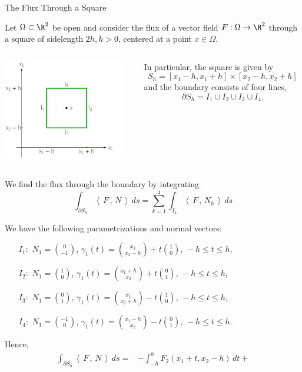 \documentclass[smaller,hyperref={CJKbookmarks=true}]{beamer}
\newcommand{\scp}[2]{\left\langle\,#1\,,\,#2\,\right\rangle} \newcommand{\scpp}{\langle\,\cdot\,,\,\cdot\,\rangle}
\begin{document}
\begin{frame}{The Flux Through a Square}
\begin{spacing}{0.9}
Let $\Omega\subset\R^2$ be open and consider the flux of a vector field $F:\Omega\to\R^2$ through a square of sidelength $2h,h>0$, centered at a point $x\in\Omega$.%
\begin{columns}[onlytextwidth]
\begin{column}{0.5\textwidth}
\includegraphics[width=\columnwidth,height=125pt]{89.jpg}
\end{column}
\begin{column}{0.5\textwidth}
In particular, the square is given by
\[S_h=[x_1-h,x_1+h]\times[x_2-h,x_2+h]\]
and the boundary consists of four lines,
\[\partial S_h=I_1\cup I_2\cup I_3\cup I_4.\]
\end{column}
\end{columns}
We find the flux through the boundary by integrating
\[\int_{\partial S_h}\scp{F}{N}\,ds=\sum_{k=1}^{4}\int_{I_k}\scp{F}{N_k}\,ds\]
\end{spacing}
\newpage
\begin{spacing}{1.05}
We have the following parametrizations and normal vectors:
\begin{itemize}
  \item[$I_1:$] $N_1=\binom{0}{-1}$, $\gamma_1(t)=\binom{x_1}{x_2-h}+t\binom{1}{0},\,
      -h\leq t\leq h$,
  \item[$I_2:$] $N_1=\binom{1}{0}$, $\gamma_1(t)=\binom{x_1+h}{x_2}+t\binom{0}{1},\,
      -h\leq t\leq h$,
  \item[$I_3:$] $N_1=\binom{0}{1}$, $\gamma_1(t)=\binom{x_1}{x_2+h}-t\binom{1}{0},\,
      -h\leq t\leq h$,
  \item[$I_4:$] $N_1=\binom{-1}{0}$, $\gamma_1(t)=\binom{x_1-h}{x_2}-t\binom{0}{1},\,
      -h\leq t\leq h$.
\end{itemize}
Hence,
\begin{equation*}
  \begin{split}
     \int_{\partial S_h}\scp{F}{N}\,ds= &-\int_{-h}^{h}F_2(x_1+t,x_2-h)\,dt+

\end{split}
\end{equation*}
\end{spacing}
\end{frame}
\end{document}

